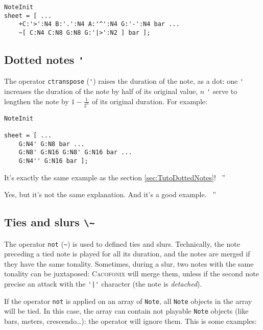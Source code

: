 \documentclass{article}
\newcommand\cacofonix{\textsc{Cacofonix}\xspace}
\newcommand\note{\lstinline!Note!\xspace}
\newenvironment{meenv}{ \par \noindent \makebox[6em][r]{ \textcolor{mecolor}{Me}: `` --~}}{~''}
\newenvironment{myselfenv}{ \par \noindent \makebox[6em][r]{ \textcolor{myselfcolor}{Myself}: `` --~}}{~''}
\newcommand{ \me }[1]{%
\begin{meenv}%
	#1%
\end{meenv} }
\newcommand{ \myself }[1]{%
\begin{myselfenv}%
	#1%
\end{myselfenv} }
\begin{document}
\begin{lstlisting}
NoteInit
sheet = [ ...
	+C:'>':N4 B:'.':N4 A:'^':N4 G:'-':N4 bar ...
	~[ C:N4 C:N8 G:N8 G:'|>':N2 ] bar ];
\end{lstlisting}

\subsection{Dotted notes \lstinline!'!}
\label{sec:DottedNotes}

The operator \lstinline!ctranspose! (\lstinline!'!) raises the duration of the note, as a dot: one \lstinline!'! increases the duration of the note by half of its original value, $n$ \lstinline!'! serve to lengthen the note by $1 - \frac{1}{2^n}$ of its original duration. For example: \\

\begin{lstlisting}
NoteInit

sheet = [ ...
	G:N4' G:N8 bar ...
	G:N8' G:N16 G:N8' G:N16 bar ...
	G:N4'' G:N16 bar ];
\end{lstlisting}

\me{It's exactly the same example as the section \ref{sec:TutoDottedNotes}!}
\myself{Yes, but it's not the same explanation. And it's a good example.}

\subsection{Ties and slurs \lstinline!\~!}
\label{sec:TiesAndSlurs}

The operator \lstinline!not! (\lstinline!~!) is used to defined ties and slurs. Technically, the note preceding a tied note is played for all its duration, and the notes are merged if they have the same tonality. Sometimes, during a slur, two notes with the same tonality can be juxtaposed: \cacofonix will merge them, unless if the second note precise an attack with the \lstinline!'|'! character (the note is \emph{detached}).

If the operator \lstinline!not! is applied on an array of \note, all \note objects in the array will be tied. In this case, the array can contain not playable \note objects (like bars, meters, crescendo\dots): the operator will ignore them. This is some examples: \\
\end{document}
